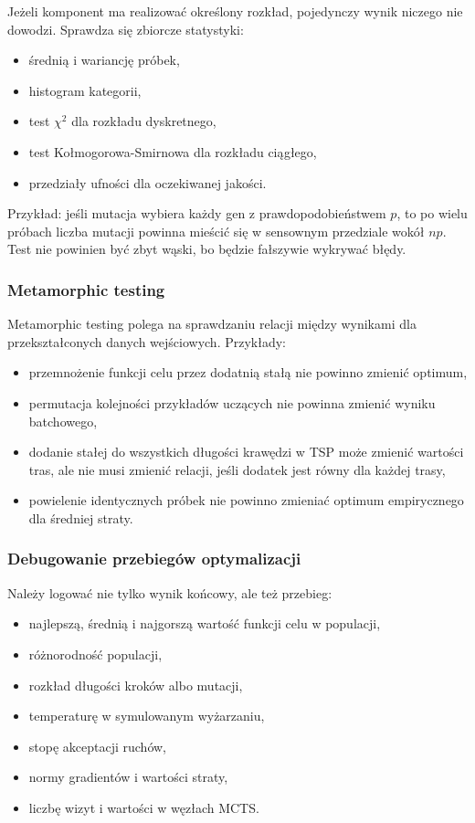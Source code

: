 Jeżeli komponent ma realizować określony rozkład, pojedynczy wynik niczego nie dowodzi. Sprawdza się zbiorcze statystyki:
\begin{itemize}
  \item średnią i wariancję próbek,
  \item histogram kategorii,
  \item test $\chi^2$ dla rozkładu dyskretnego,
  \item test Kołmogorowa-Smirnowa dla rozkładu ciągłego,
  \item przedziały ufności dla oczekiwanej jakości.
\end{itemize}

Przykład: jeśli mutacja wybiera każdy gen z prawdopodobieństwem $p$, to po wielu próbach liczba mutacji powinna mieścić się w sensownym przedziale wokół $np$. Test nie powinien być zbyt wąski, bo będzie fałszywie wykrywać błędy.

\subsubsection{Metamorphic testing}

Metamorphic testing polega na sprawdzaniu relacji między wynikami dla przekształconych danych wejściowych. Przykłady:
\begin{itemize}
  \item przemnożenie funkcji celu przez dodatnią stałą nie powinno zmienić optimum,
  \item permutacja kolejności przykładów uczących nie powinna zmienić wyniku batchowego,
  \item dodanie stałej do wszystkich długości krawędzi w TSP może zmienić wartości tras, ale nie musi zmienić relacji, jeśli dodatek jest równy dla każdej trasy,
  \item powielenie identycznych próbek nie powinno zmieniać optimum empirycznego dla średniej straty.
\end{itemize}

\subsubsection{Debugowanie przebiegów optymalizacji}

Należy logować nie tylko wynik końcowy, ale też przebieg:
\begin{itemize}
  \item najlepszą, średnią i najgorszą wartość funkcji celu w populacji,
  \item różnorodność populacji,
  \item rozkład długości kroków albo mutacji,
  \item temperaturę w symulowanym wyżarzaniu,
  \item stopę akceptacji ruchów,
  \item normy gradientów i wartości straty,
  \item liczbę wizyt i wartości w węzłach MCTS.
\end{itemize}

